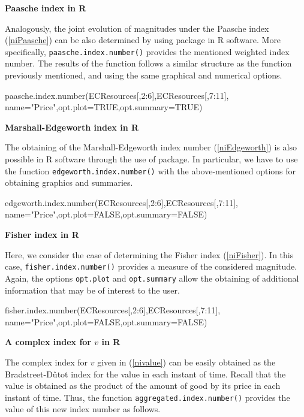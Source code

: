 \vspace*{0.15 cm}\noindent\textbf{Paasche index in R}

\noindent Analogously, the joint evolution of magnitudes under the Paasche index (\ref{niPaasche}) can be also determined by using  package in R software. More specifically, \verb|paasche.index.number()| provides the mentioned weighted index number. The results of the function follows a similar structure as the function previously mentioned, and using the same graphical and numerical options. 

\begin{example}
paasche.index.number(ECResources[,2:6],ECResources[,7:11],
                     name="Price",opt.plot=TRUE,opt.summary=TRUE)
\end{example}

\vspace*{0.15 cm}\noindent\textbf{Marshall-Edgeworth index in R}

\noindent The obtaining of the Marshall-Edgeworth index number (\ref{niEdgeworth}) is also possible in R software through the use of  package. In particular, we have to use the function \verb|edgeworth.index.number()| with the above-mentioned options for obtaining graphics and summaries.

\begin{example}
edgeworth.index.number(ECResources[,2:6],ECResources[,7:11],
                       name="Price",opt.plot=FALSE,opt.summary=FALSE)
\end{example}

\vspace*{0.15 cm}\noindent\textbf{Fisher index in R}

\noindent Here, we consider the case of determining the Fisher index (\ref{niFisher}). In this case, \verb|fisher.index.number()| provides a measure of the considered magnitude. Again, the options \verb|opt.plot| and \verb|opt.summary| allow the obtaining of additional information that may be of interest to the user.

\begin{example}
fisher.index.number(ECResources[,2:6],ECResources[,7:11],
                    name="Price",opt.plot=FALSE,opt.summary=FALSE)
\end{example}

\vspace*{0.15 cm}\noindent\textbf{A complex index for $v$ in R}

\noindent The complex index for $v$ given in (\ref{nivalue}) can be easily obtained as the Bradstreet-Dûtot index for the value in each instant of time. Recall that the value is obtained as the product of the amount of good by its price in each instant of time. Thus, the function \verb|aggregated.index.number()| provides the value of this new index number as follows.


